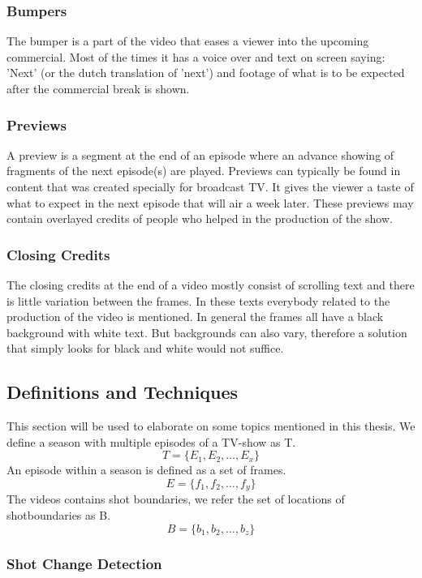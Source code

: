 \documentclass{article}
\begin{document}
\subsubsection{Bumpers}
The bumper is a part of the video that eases a viewer into the upcoming commercial. Most of the times it has a voice over and text on screen saying: 'Next' (or the dutch translation of 'next') and footage of what is to be expected after the commercial break is shown.

\subsubsection{Previews}
A preview is a segment at the end of an episode where an advance showing of fragments of the next episode(s) are played. Previews can typically be found in content that was created specially for broadcast TV. It gives the viewer a taste of what to expect in the next episode that will air a week later. These previews may contain overlayed credits of people who helped in the production of the show.

\subsubsection{Closing Credits}
The closing credits at the end of a video mostly consist of scrolling text and there is little variation between the frames. In these texts everybody related to the production of the video is mentioned. In general the frames all have a black background with white text. But backgrounds can also vary, therefore a solution that simply looks for black and white would not suffice.

\subsection{Definitions and Techniques}
This section will be used to elaborate on some topics mentioned in this thesis. We define a season with multiple episodes of a TV-show as T.
\[T = \{E_1, E_2, \dots, E_x\}\]
An episode within a season is defined as a set of frames.
\[E = \{f_1, f_2, \dots, f_y\}\]
The videos contains shot boundaries, we refer the set of locations of shotboundaries as B.
\[B = \{b_1, b_2, \dots, b_z\}\]

\subsubsection{Shot Change Detection}
\end{document}
